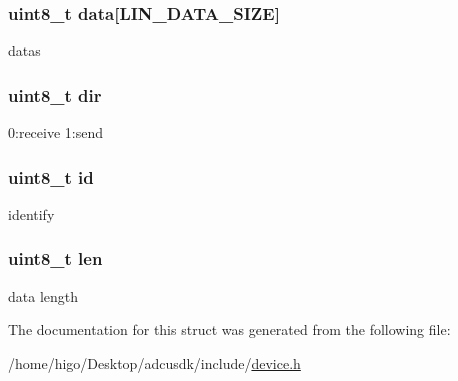 \subsubsection[{\texorpdfstring{data}{data}}]{\setlength{\rightskip}{0pt plus 5cm}uint8\+\_\+t data\mbox{[}{\bf L\+I\+N\+\_\+\+D\+A\+T\+A\+\_\+\+S\+I\+ZE}\mbox{]}}\hypertarget{structp__adcuLinData_a87a96d212d536666bdd947f932f22fb1}{}\label{structp__adcuLinData_a87a96d212d536666bdd947f932f22fb1}
datas 
\subsubsection[{\texorpdfstring{dir}{dir}}]{\setlength{\rightskip}{0pt plus 5cm}uint8\+\_\+t dir}\hypertarget{structp__adcuLinData_a92abda0bec7c1c978fe96f87aad18067}{}\label{structp__adcuLinData_a92abda0bec7c1c978fe96f87aad18067}
0\+:receive 1\+:send 
\subsubsection[{\texorpdfstring{id}{id}}]{\setlength{\rightskip}{0pt plus 5cm}uint8\+\_\+t id}\hypertarget{structp__adcuLinData_a1e6927fa1486224044e568f9c370519b}{}\label{structp__adcuLinData_a1e6927fa1486224044e568f9c370519b}
identify 
\subsubsection[{\texorpdfstring{len}{len}}]{\setlength{\rightskip}{0pt plus 5cm}uint8\+\_\+t len}\hypertarget{structp__adcuLinData_a5723e60ffd628510c699eddbce90be23}{}\label{structp__adcuLinData_a5723e60ffd628510c699eddbce90be23}
data length 

The documentation for this struct was generated from the following file\+:\begin{DoxyCompactItemize}
\item 
/home/higo/\+Desktop/adcusdk/include/\hyperlink{device_8h}{device.\+h}\end{DoxyCompactItemize}

